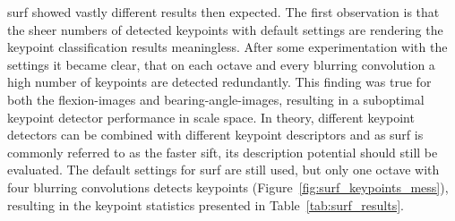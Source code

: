 \acrshort{surf} showed vastly different results then expected.
The first observation is that the sheer numbers of detected keypoints with default settings are rendering the keypoint classification results meaningless.
After some experimentation with the settings it became clear, that on each octave and every blurring convolution a high number of keypoints are detected redundantly.
This finding was true for both the \glspl{flexion-image} and \glspl{bearing-angle-image}, resulting in a suboptimal keypoint detector performance in scale space.
In theory, different keypoint detectors can be combined with different keypoint descriptors and as \acrshort{surf} is commonly referred to as the faster \acrshort{sift}, its description potential should still be evaluated.
The default settings for \acrshort{surf} are still used, but only one octave with four blurring convolutions detects keypoints (Figure~\ref{fig:surf_keypoints_mess}), resulting in the keypoint statistics presented in Table~\ref{tab:surf_results}.
\vspace{-2mm}
